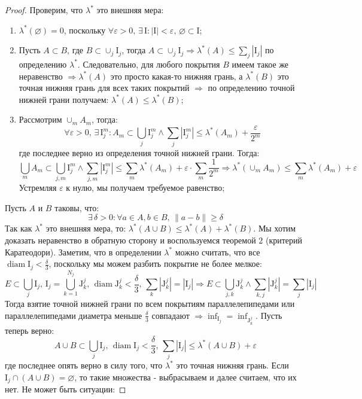 \documentclass[12pt]{article}
\newcommand{\MI}{\mathrm{I}}
\newcommand{\MJ}{\mathrm{J}}
\newcommand{\VN}{\varnothing}
\newcommand{\VE}{\varepsilon}
\theoremstyle{definition}
\DeclareMathOperator{\diam}{\text{diam}}
\newcommand{\ddsum}[2]{\displaystyle\sum\limits_{#1}^{#2}}
\begin{document}
\begin{proof}
	Проверим, что $\lambda^*$ это внешняя мера:
	\begin{enumerate}[label=\arabic*)]
		\item $\lambda^*(\VN) = 0$, поскольку $\forall \VE > 0, \, \exists \, \MI \colon |\MI| < \VE, \, \VN \subset \MI$;
		\item Пусть $A \subset B$, где $B \subset \cup_j \MI_j$, тогда $A \subset \cup_j \MI_j \Rightarrow \lambda^*(A) \leq \sum_j |\MI_j|$ по определению $\lambda^*$. Следовательно, для любого покрытия $B$ имеем такое же неравенство $\Rightarrow \lambda^*(A)$ это просто какая-то нижняя грань, а $\lambda^*(B)$ это точная нижняя грань для всех таких покрытий $\Rightarrow$ по определению точной нижней грани получаем: $\lambda^*(A) \leq \lambda^*(B)$;
		\item Рассмотрим $\cup_m A_m$, тогда:
		$$
			\forall \VE > 0, \, \exists \, \MI_j^m \colon A_m \subset \bigcup\limits_j \MI_j^m \wedge \sum_j|\MI_j^m| \leq \lambda^*(A_m) + \dfrac{\VE}{2^m} 
		$$
		где последнее верно из определения точной нижней грани. Тогда:
		$$
			\bigcup\limits_m A_m \subset \bigcup\limits_{j,m}\MI_j^m \wedge \ddsum{j,m}{}|\MI_j^m|\leq \ddsum{m}{}\lambda^*(A_m) + \VE{\cdot}\ddsum{m}{}\dfrac{1}{2^m} \Rightarrow \lambda^*(\cup_m A_m) \leq \ddsum{m}{}\lambda^*(A_m) + \VE
		$$
		Устремляя $\VE$ к нулю, мы получаем требуемое равенство;
	\end{enumerate}
	Пусть $A$ и $B$ таковы, что:
	$$
		\exists \, \delta > 0 \colon \forall a \in A, b \in B,\, \|a - b\| \geq \delta
	$$
	Так как $\lambda^*$ это внешняя мера, то: $\lambda^*(A \cup B) \leq \lambda^*(A) + \lambda^*(B)$. Мы хотим доказать неравенство в обратную сторону и воспользуемся теоремой $2$ (критерий Каратеодори). Заметим, что в определении $\lambda^*$ можно считать, что все $\diam{\MI_j} < \tfrac{\delta}{3}$, поскольку мы можем разбить покрытие не более мелкое:
	$$
		E \subset \bigcup\limits_j \MI_j, \, \MI_j = \bigcup\limits_{k = 1}^{N_j} \MJ_k^j, \, \diam{\MJ_k^j} < \dfrac{\delta}{3}, \, \ddsum{k}{}|\MJ_k^j| = |\MI_j| \Rightarrow  E \subset \bigcup\limits_{j,k}\MJ_k^j \wedge \ddsum{k,j}{}|\MJ_k^j| = \ddsum{j}{}|\MI_j|
	$$
	Тогда взятие точной нижней грани по всем покрытиям параллелепипедами или параллелепипедами диаметра меньше $\tfrac{\delta}{3}$ совпадают $\Rightarrow \inf_{\MI_j} = \inf_{\MJ_k^j}$. Пусть теперь верно:
	$$
		A \cup B \subset \bigcup\limits_j \MI_j, \, \diam{\MI_j} < \dfrac{\delta}{3}, \, \ddsum{j}{}|\MI_j| \leq \lambda^*(A \cup B) + \VE
	$$
	где последнее опять верно в силу того, что $\lambda^*$ это точная нижняя грань. Если $\MI_j \cap (A \cup B) = \VN$, то такие множества - выбрасываем и далее считаем, что их нет. Не может быть ситуации:

\end{proof}
\end{document}
